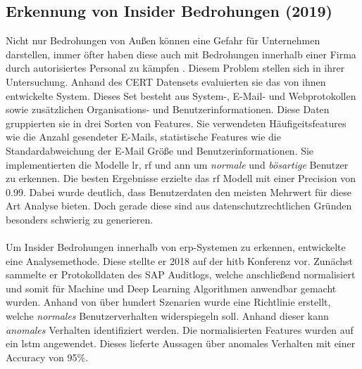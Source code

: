 \documentclass[
    12pt, %
    DIV10,
    ngerman, %
    a4paper, %
    oneside, %
    titlepage, %
    parskip=half, %
    headings=normal, %
    listof=totoc, %
    bibliography=totoc, %
    index=totoc, %
    captions=tableheading, %
    final %
]{scrreprt}
\begin{document}
\subsection{Erkennung von Insider Bedrohungen (2019)}\label{cert}
Nicht nur Bedrohungen von Au{\ss}en können eine Gefahr für Unternehmen darstellen, immer öfter haben diese auch mit Bedrohungen innerhalb einer Firma durch autorisiertes Personal zu kämpfen \parencite{Partners}. Diesem Problem stellen sich \textcite{Le2019} in ihrer Untersuchung. Anhand des CERT Datensets \parencite{glasser2013bridging} evaluierten sie das von ihnen entwickelte System. Dieses Set besteht aus System-, E-Mail- und Webprotokollen sowie zusätzlichen Organisations- und Benutzerinformationen. Diese Daten gruppierten sie in drei Sorten von Features. Sie verwendeten Häufigeitsfeatures wie die Anzahl gesendeter E-Mails, statistische Features wie die Standardabweichung der E-Mail Grö{\ss}e und Benutzerinformationen. Sie implementierten die Modelle \ac{lr}, \ac{rf} und \ac{ann} um \emph{normale} und \emph{bösartige} Benutzer zu erkennen. Die besten Ergebnisse erzielte das \ac{rf} Modell mit einer Precision von 0.99. Dabei wurde deutlich, dass Benutzerdaten den meisten Mehrwert für diese Art Analyse bieten. Doch gerade diese sind aus datenschutzrechtlichen Gründen besonders schwierig zu generieren. 
\\\\
Um Insider Bedrohungen innerhalb von \ac{erp}-Systemen zu erkennen, entwickelte \textcite{Neyolov} eine Analysemethode. Diese stellte er 2018 auf der \ac{hitb} Konferenz vor. Zunächst sammelte er Protokolldaten des SAP Auditlogs, welche anschlie{\ss}end normalisiert und somit für Machine und Deep Learning Algorithmen anwendbar gemacht wurden. Anhand von über hundert Szenarien wurde eine Richtlinie erstellt, welche \emph{normales} Benutzerverhalten widerspiegeln soll. Anhand dieser kann \emph{anomales} Verhalten identifiziert werden. Die normalisierten Features wurden auf ein \ac{lstm} angewendet. Dieses lieferte Aussagen über anomales Verhalten mit einer Accuracy von 95\%.
\end{document}
